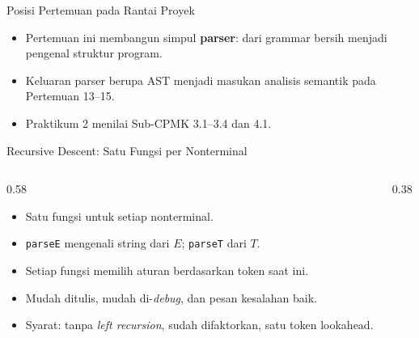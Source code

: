 \documentclass[aspectratio=169,10pt,t]{beamer}
\begin{document}
\begin{frame}{Posisi Pertemuan pada Rantai Proyek}

  \vspace{2pt}
  \begin{itemize}
    \item Pertemuan ini membangun simpul \textbf{parser}: dari grammar
          bersih menjadi pengenal struktur program.
    \item Keluaran parser berupa AST menjadi masukan analisis semantik
          pada Pertemuan 13--15.
    \item Praktikum 2 menilai Sub-CPMK 3.1--3.4 dan 4.1.
  \end{itemize}
\end{frame}

\begin{frame}{Recursive Descent: Satu Fungsi per Nonterminal}
  \begin{columns}[T,onlytextwidth]
    \begin{column}{0.58\textwidth}
      \begin{itemize}
        \item Satu fungsi untuk setiap nonterminal.
        \item \texttt{parseE} mengenali string dari \(E\);
              \texttt{parseT} dari \(T\).
        \item Setiap fungsi memilih aturan berdasarkan token saat ini.
        \item Mudah ditulis, mudah di-\textit{debug}, dan pesan kesalahan
              baik.
        \item Syarat: tanpa \textit{left recursion}, sudah difaktorkan,
              satu token lookahead.
      \end{itemize}
    \end{column}
    \begin{column}{0.38\textwidth}
      \centering
    \end{column}
  \end{columns}
\end{frame}
\end{document}
